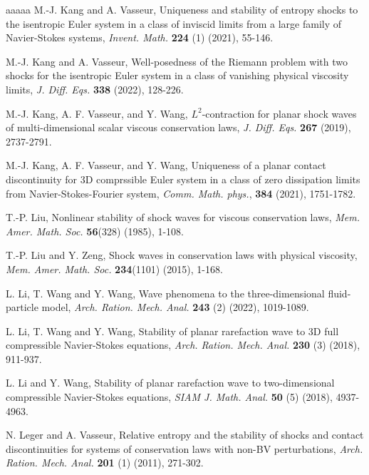 \documentclass[10pt,reqno]{amsart}
\numberwithin{equation}{section}
\begin{document}
\begin{thebibliography}{aaaaa}
  M.-J. Kang and A. Vasseur, Uniqueness and stability of entropy shocks to the isentropic Euler system in a class of inviscid limits from a large family of Navier-Stokes systems, {\it Invent. Math.} {\bf 224} (1) (2021), 55-146.

  M.-J. Kang and A. Vasseur, Well-posedness of the Riemann problem with two shocks for the isentropic Euler system in a class of vanishing physical viscosity limits, {\it J. Diff. Eqs.} {\bf 338}  (2022), 128-226.

 M.-J. Kang, A. F. Vasseur, and Y. Wang, $L^2$-contraction for planar shock waves of multi-dimensional scalar viscous conservation laws, {\it J. Diff. Eqs.} {\bf 267}  (2019), 2737-2791.

 M.-J. Kang, A. F. Vasseur, and Y. Wang, Uniqueness of a planar contact discontinuity for 3D comprssible Euler system in a class of zero dissipation limits from Navier-Stokes-Fourier system, {\it Comm. Math. phys.}, {\bf 384}  (2021), 1751-1782.



  T.-P. Liu, Nonlinear stability of shock waves for viscous conservation laws, {\it Mem. Amer. Math. Soc.} {\bf 56}(328)  (1985), 1-108.

  T.-P. Liu and Y. Zeng, Shock waves in conservation laws with physical viscosity, {\it Mem. Amer. Math. Soc.} {\bf 234}(1101)  (2015), 1-168.

  L. Li, T. Wang and Y. Wang, Wave phenomena to the three-dimensional fluid-particle model, {\it Arch. Ration. Mech. Anal.} {\bf 243} (2) (2022), 1019-1089.

  L. Li, T. Wang and Y. Wang, Stability of planar rarefaction wave to 3D full compressible Navier-Stokes equations, {\it Arch. Ration. Mech. Anal.} {\bf 230} (3) (2018), 911-937.

 L. Li and Y. Wang, Stability of planar rarefaction wave to two-dimensional compressible Navier-Stokes equations, {\it SIAM J. Math. Anal.} {\bf 50} (5) (2018), 4937-4963.


  N. Leger and A. Vasseur, Relative entropy and the stability of shocks and contact discontinuities for systems of conservation laws with non-BV perturbations, {\it Arch. Ration. Mech. Anal.} {\bf 201} (1) (2011), 271-302.


\end{thebibliography}
\end{document}
